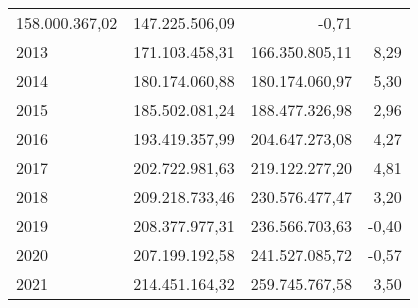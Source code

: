 \begin{tabular}{llll}
  \multicolumn{1}{|r}{158.000.367,02} &
  \multicolumn{1}{r}{147.225.506,09} &
  \multicolumn{1}{r}{-0,71} \\
\multicolumn{1}{l}{\hspace{1em}2013} &
  \multicolumn{1}{|r}{171.103.458,31} &
  \multicolumn{1}{r}{166.350.805,11} &
  \multicolumn{1}{r}{8,29} \\
\multicolumn{1}{l}{\hspace{1em}2014} &
  \multicolumn{1}{|r}{180.174.060,88} &
  \multicolumn{1}{r}{180.174.060,97} &
  \multicolumn{1}{r}{5,30} \\
\multicolumn{1}{l}{\hspace{1em}2015} &
  \multicolumn{1}{|r}{185.502.081,24} &
  \multicolumn{1}{r}{188.477.326,98} &
  \multicolumn{1}{r}{2,96} \\
\multicolumn{1}{l}{\hspace{1em}2016} &
  \multicolumn{1}{|r}{193.419.357,99} &
  \multicolumn{1}{r}{204.647.273,08} &
  \multicolumn{1}{r}{4,27} \\
\multicolumn{1}{l}{\hspace{1em}2017} &
  \multicolumn{1}{|r}{202.722.981,63} &
  \multicolumn{1}{r}{219.122.277,20} &
  \multicolumn{1}{r}{4,81} \\
\multicolumn{1}{l}{\hspace{1em}2018} &
  \multicolumn{1}{|r}{209.218.733,46} &
  \multicolumn{1}{r}{230.576.477,47} &
  \multicolumn{1}{r}{3,20} \\
\multicolumn{1}{l}{\hspace{1em}2019} &
  \multicolumn{1}{|r}{208.377.977,31} &
  \multicolumn{1}{r}{236.566.703,63} &
  \multicolumn{1}{r}{-0,40} \\
\multicolumn{1}{l}{\hspace{1em}2020} &
  \multicolumn{1}{|r}{207.199.192,58} &
  \multicolumn{1}{r}{241.527.085,72} &
  \multicolumn{1}{r}{-0,57} \\
\multicolumn{1}{l}{\hspace{1em}2021} &
  \multicolumn{1}{|r}{214.451.164,32} &
  \multicolumn{1}{r}{259.745.767,58} &
  \multicolumn{1}{r}{3,50} \\
\cline{1-4}
\end{tabular}
